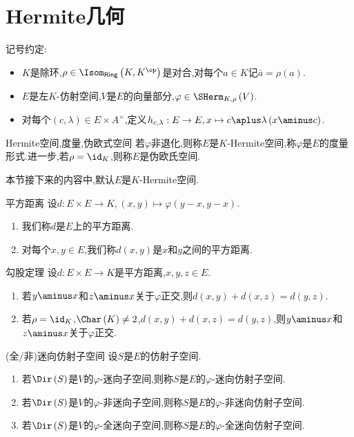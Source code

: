 \section{Hermite几何}


记号约定:
\begin{itemize}
	\item $K$是除环,$\rho\in\Isom_{\mathsf{Ring}}\left(K,K^{\op}\right)$是对合,对每个$a\in K$记$\bar{a}=\rho\left(a\right)$.
	\item $E$是左$K$-仿射空间,$V$是$E$的向量部分,$\varphi\in\SHerm_{K,\rho}\left(V\right)$.
	\item 对每个$\left(c,\lambda\right)\in E\times A^{\times}$,定义$h_{c,\lambda}:E\to E,x\mapsto c\aplus\lambda\left(x\aminus c\right)$.
\end{itemize}

\begin{definition}{Hermite空间,度量,伪欧式空间}{}
	若$\varphi$非退化,则称$E$是$K$-Hermite空间,称$\varphi$是$E$的度量形式.进一步,若$\rho=\id_{K}$,则称$E$是伪欧氏空间.
\end{definition}

本节接下来的内容中,默认$E$是$K$-Hermite空间.

\begin{definition}{平方距离}{}
	设$d:E\times E\to K,\left(x,y\right)\mapsto\varphi\left(y-x,y-x\right)$.
	\begin{enumerate}
		\item 我们称$d$是$E$上的平方距离.
		\item 对每个$x,y\in E$,我们称$d\left(x,y\right)$是$x$和$y$之间的平方距离.
	\end{enumerate}
\end{definition}

\begin{proposition}{勾股定理}{}
	设$d:E\times E\to K$是平方距离,$x,y,z\in E$.
	\begin{enumerate}
		\item 若$y\aminus x$和$z\aminus x$关于$\varphi$正交,则$d\left(x,y\right)+d\left(x,z\right)=d\left(y,z\right)$.
		\item 若$\rho=\id_{K}$,$\Char\left(K\right)\neq 2$,$d\left(x,y\right)+d\left(x,z\right)=d\left(y,z\right)$,则$y\aminus x$和$z\aminus x$关于$\varphi$正交.
	\end{enumerate}
\end{proposition}

\begin{definition}{(全/非)迷向仿射子空间}{}
	设$S$是$E$的仿射子空间.
	\begin{enumerate}
		\item 若$\Dir\left(S\right)$是$V$的$\varphi$-迷向子空间,则称$S$是$E$的$\varphi$-迷向仿射子空间.
		\item 若$\Dir\left(S\right)$是$V$的$\varphi$-非迷向子空间,则称$S$是$E$的$\varphi$-非迷向仿射子空间.
		\item 若$\Dir\left(S\right)$是$V$的$\varphi$-全迷向子空间,则称$S$是$E$的$\varphi$-全迷向仿射子空间.
	\end{enumerate}
\end{definition}

